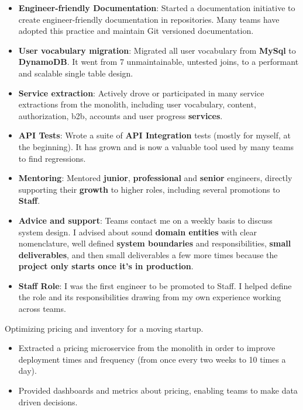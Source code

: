 \documentclass[10pt,a4paper,ragged2e,withhyper]{altacv}
\newcommand{\accentbold}[1]{\textbf{\textcolor{accent}{#1}}}
\begin{document}
\begin{paracol}{2}
{\begin{itemize}
\item \accentbold{Engineer-friendly Documentation}: Started a documentation initiative to create engineer-friendly documentation in repositories. Many teams have adopted this practice and maintain Git versioned documentation.
\item \accentbold{User vocabulary migration}: Migrated all user vocabulary from \accentbold{MySql} to \accentbold{DynamoDB}. It went from 7 unmaintainable, untested joins, to a performant and scalable single table design.
\item \accentbold{Service extraction}: Actively drove or participated in many service extractions from the monolith, including user vocabulary, content, authorization, b2b, accounts and user progress \accentbold{services}.
\item \accentbold{API Tests}: Wrote a suite of \accentbold{API Integration} tests (mostly for myself, at the beginning). It has grown and is now a valuable tool used by many teams to find regressions.
\item \accentbold{Mentoring}: Mentored \accentbold{junior}, \accentbold{professional} and \accentbold{senior} engineers, directly supporting their \accentbold{growth} to higher roles, including several promotions to \accentbold{Staff}.
\item \accentbold{Advice and support}: Teams contact me on a weekly basis to discuss system design. I advised about sound \accentbold{domain entities} with clear nomenclature, well defined \accentbold{system boundaries} and responsibilities, \accentbold{small deliverables}, and then small deliverables a few more times because the \accentbold{project only starts once it's in production}.
\item \accentbold{Staff Role}: I was the first engineer to be promoted to Staff. I helped define the role and its responsibilities drawing from my own experience working across teams.
\end{itemize}
}

\divider


Optimizing pricing and inventory for a moving startup.

{\RaggedRight
\begin{itemize}
\item Extracted a pricing microservice from the monolith in order to improve deployment times and frequency (from once every two weeks to 10 times a day).
\item Provided dashboards and metrics about pricing, enabling teams to make data driven decisions.
\end{itemize}
}


\end{paracol}
\end{document}
